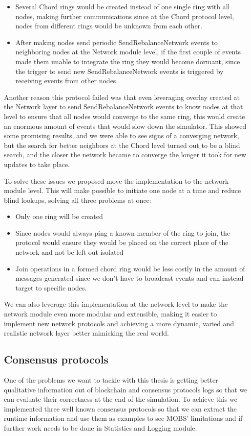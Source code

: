 \begin{itemize}
  \item Several Chord rings would be created instead of one single ring with all nodes,
making further communications since at the Chord protocol level, nodes from different rings
would be unknown from each other.
  \item After making nodes send periodic SendRebalanceNetwork events to neighboring
nodes at the Network module level, if the first couple of events made them unable to
integrate the ring they would become dormant, since the trigger to send  new
SendRebalanceNetwork events is triggered  by receiving events from other nodes
\end{itemize}

Another reason this protocol failed was that even leveraging overlay created at
the Network layer to send SendRebalanceNetwork events to know nodes at that level
to ensure that all nodes would converge to the same ring, this would create an enormous
amount of events that would slow down the simulator. This showed some promising results,
and we were able to see signs of a converging network, but the search for better neighbors
at the Chord level turned out to be a blind search, and the closer the network became to
converge the longer it took for new updates to take place.

To solve these issues we proposed move the implementation to the network module level.
This will make possible to initiate one node at a time and reduce blind lookups, solving
all three problems at once: 
\begin{itemize}
  \item Only one ring will be created
  \item Since nodes would always ping a known
member of the ring to join, the protocol would ensure they would be placed on the correct place
of the network and not be left out isolated
  \item Join operations in a formed chord ring would be less costly in the amount
of messages generated since we don't have to broadcast events and can instead target
to specific nodes.
\end{itemize}

We can also leverage this implementation at the network level to make the network
module even more modular and extensible, making it easier to implement new network protocols
and achieving a more dynamic, varied and realistic network layer better mimicking the real world.

\subsection{Consensus protocols}\label{sub:consensus_protocols_implemented}
One of the problems we want to tackle with this thesis is getting better qualitative information out of
blockchain and consensus protocols logs so that we can evaluate their correctness at the end 
of the simulation. To achieve this we implemented three well known consensus protocols
so that we can extract the runtime information and use them as examples to see MOBS' limitations
and if further work needs to be done in Statistics and Logging module.

